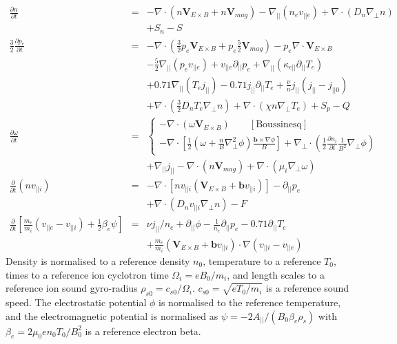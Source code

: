 \documentclass[12pt,a4paper]{article}
\newcommand{\deriv}[2]{\frac{\partial #1}{\partial #2}}
\begin{document}
\begin{eqnarray}
  \deriv{n}{t} &=& -\nabla\cdot\left(n\mathbf{V}_{E\times B} + n\mathbf{V}_{mag}\right) - \nabla_{||}\left(n_e v_{||e}\right) + \nabla\cdot\left(D_n\nabla_\perp n\right) \nonumber \\
  && + S_n - S \\
  \frac{3}{2}\deriv{p_e}{t} &=& -\nabla\cdot\left(\frac{3}{2}p_e\mathbf{V}_{E\times B} + p_e\frac{5}{2}\mathbf{V}_{mag}\right) - p_e\nabla\cdot\mathbf{V}_{E\times B} \nonumber \\
  && - \frac{5}{2}\nabla_{||}\left(p_e v_{||e}\right) + v_{||e}\partial_{||}p_e  + \nabla_{||}\left(\kappa_{e||}\partial_{||}T_e\right) \nonumber \\
  && + 0.71\nabla_{||}\left(T_e j_{||}\right) - 0.71 j_{||}\partial_{||} T_e + \frac{\nu}{n}j_{||}\left(j_{||} - j_{||0}\right)\nonumber \\
  &&+ \nabla\cdot \left(\frac{3}{2}D_nT_e\nabla_\perp n\right) + \nabla\cdot\left(\chi n\nabla_\perp T_e\right) + S_p - Q\\
  \deriv{\omega}{t} &=& \left\{\begin{array}{l}
  -\nabla\cdot\left(\omega\mathbf{V}_{E\times B}\right) \qquad \mathrm{[Boussinesq]} \\
  -\nabla\cdot\left[\frac{1}{2}\left(\omega + \frac{n}{B}\nabla_\perp^2\phi\right)\frac{\mathbf{b}\times\nabla\phi}{B}\right] + \nabla_\perp\cdot\left(\frac{1}{2}\frac{\partial n_i}{\partial t}\frac{1}{B^2}\nabla_\perp\phi\right) \end{array}\right. \nonumber \\
  &&+ \nabla_{||}j_{||} - \nabla\cdot\left(n \mathbf{V}_{mag}\right)  + \nabla\cdot\left(\mu_i\nabla_\perp\omega\right)  \\
  \frac{\partial}{\partial t}\left(nv_{||i}\right) &=& -\nabla\cdot\left[nv_{||i}\left(\mathbf{V}_{E\times B}+ \mathbf{b}v_{||i}\right)\right] - \partial_{||}p_e \nonumber\\
  && + \nabla\cdot \left(D_nv_{||i}\nabla_\perp n\right) - F \\
  \frac{\partial}{\partial t}\left[\frac{m_e}{m_i}\left(v_{||e}-v_{||i}\right) + \frac{1}{2}\beta_e\psi\right] &=& \nu j_{||}/n_e + \partial_{||}\phi - \frac{1}{n_e}\partial_{||} p_e - 0.71\partial_{||} T_e \label{eq:ohmslaw} \\
  &&+ \frac{m_e}{m_i}\left(\mathbf{V}_{E\times B} + \mathbf{b}v_{||i}\right)\cdot\nabla\left(v_{||i} - v_{||e}\right)
\end{eqnarray}
Density is normalised to a reference density $n_0$, temperature to a
reference $T_0$, times to a reference ion cyclotron time $\Omega_i = eB_0/m_i$, and length scales to a reference ion sound gyro-radius $\rho_{s0} = c_{s0}/\Omega_i$. $c_{s0} = \sqrt{eT_0/m_i}$ is a reference sound speed.
The electrostatic potential $\phi$ is normalised to the reference temperature, and the electromagnetic potential is normalised as $\psi = -2A_{||} / \left(B_0\beta_e\rho_s\right)$
with $\beta_e = 2\mu_0en_0T_0/B_0^2$ is a reference electron beta.
\end{document}
